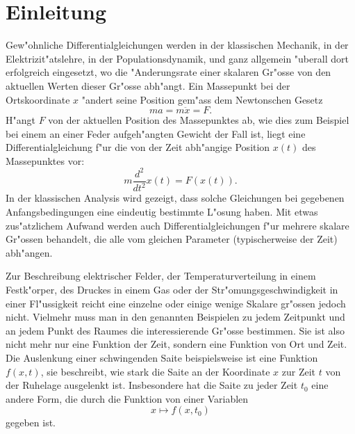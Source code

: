 %
%
%
\chapter*{Einleitung}
Gew"ohnliche Differentialgleichungen werden in der klassischen Mechanik,
in der Elektrizit"atslehre, in der Populationsdynamik, und ganz 
allgemein "uberall dort erfolgreich eingesetzt, wo die
"Anderungsrate einer skalaren Gr"osse von den aktuellen Werten dieser Gr"osse
abh"angt.
Ein Massepunkt bei der Ortskoordinate $x$ "andert seine Position
gem"ass dem Newtonschen Gesetz
\[
ma=m\ddot x=F.
\]
H"angt $F$ von der aktuellen Position des Massepunktes ab, wie dies zum
Beispiel bei einem an einer Feder aufgeh"angten Gewicht der Fall ist,
liegt eine Differentialgleichung f"ur die von der Zeit abh"angige
Position $x(t)$ des Massepunktes vor:
\[
m\frac{d^2}{dt^2}x(t)=F(x(t)).
\]
In der klassischen Analysis wird gezeigt, dass solche Gleichungen bei
gegebenen Anfangsbedingungen eine eindeutig bestimmte L"osung haben.
Mit etwas zus"atzlichem Aufwand werden auch Differentialgleichungen
f"ur mehrere skalare Gr"ossen behandelt, die alle vom gleichen Parameter
(typischerweise der Zeit) abh"angen.

Zur Beschreibung elektrischer Felder, der Temperaturverteilung in
einem Fest\-k"orper, des Druckes in einem Gas oder der Str"omungsgeschwindigkeit
in einer Fl"ussigkeit reicht eine einzelne oder einige wenige Skalare
gr"ossen jedoch nicht. Vielmehr muss man in den genannten Beispielen
zu jedem Zeitpunkt und an jedem Punkt des Raumes die interessierende Gr"osse
bestimmen. Sie ist also nicht mehr nur eine Funktion der Zeit, sondern eine
Funktion von Ort und Zeit.
Die Auslenkung einer schwingenden Saite
beispielsweise ist eine Funktion $f(x,t)$, sie beschreibt, wie stark
die Saite an der Koordinate $x$ zur Zeit $t$ von der Ruhelage ausgelenkt ist.
Insbesondere hat die Saite zu jeder Zeit $t_0$ eine andere Form, die durch
die Funktion von einer Variablen
\[
x\mapsto f(x,t_0)
\]
gegeben ist.

